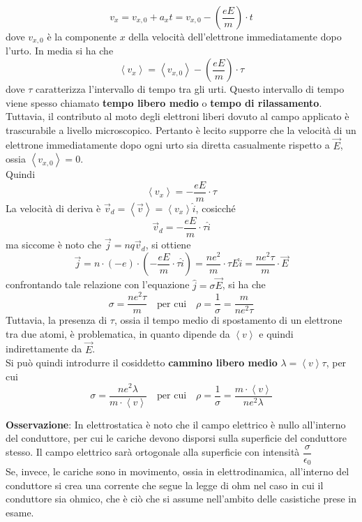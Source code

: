 \documentclass[a4paper]{extarticle}
\begin{document}
\[v_x = v_{x,0} + a_x t = v_{x,0} - \left(\dfrac{eE}{m}\right) \cdot t\]
dove $v_{x,0}$ è la componente $x$ della velocità dell'elettrone immediatamente dopo l'urto. In media si ha che
\[\left< v_x \right> = \left< v_{x,0} \right> - \left(\dfrac{eE}{m}\right) \cdot \tau\]
dove $\tau$ caratterizza l'intervallo di tempo tra gli urti. Questo intervallo di tempo viene spesso chiamato \textbf{tempo libero medio} o \textbf{tempo di rilassamento}.\\
Tuttavia, il contributo al moto degli elettroni liberi dovuto al campo applicato è trascurabile a livello microscopico. Pertanto è lecito supporre che la velocità di un elettrone immediatamente dopo ogni urto sia diretta casualmente rispetto a $\vec E$, ossia $\left<v_{x,0}\right> = 0$.\\
Quindi
\[\left<v_x\right> = - \dfrac{eE}{m} \cdot \tau\]
La velocità di deriva è $\vec{v}_d = \left<\vec v \right> = \left<v_x\right> \hat{i}$, cosicché
\[\vec{v}_d = - \dfrac{eE}{m} \cdot \tau \hat{i}\]
ma siccome è noto che $\vec j = n q \vec{v}_d$, si ottiene
\[\vec j = n \cdot (-e) \cdot \left(- \dfrac{eE}{m} \cdot \tau \hat{i}\right) = \dfrac{ne^2}{m} \cdot \tau E \hat{i} = \dfrac{ne^2 \tau}{m} \cdot \vec{E}\]
confrontando tale relazione con l'equazione $\hat{j} = \sigma \vec E$, si ha che
\[\sigma = \dfrac{n e^2 \tau}{m} \hspace{1em} \text{per cui} \hspace{1em} \rho=\dfrac{1}{\sigma} = \dfrac{m}{n e^2 \tau}\]
Tuttavia, la presenza di $\tau$, ossia il tempo medio di spostamento di un elettrone tra due atomi, è problematica, in quanto dipende da $\left<v\right>$ e quindi indirettamente da $\vec E$.\\
Si può quindi introdurre il cosiddetto \textbf{cammino libero medio} $\lambda = \left<v\right> \tau$, per cui
\[\sigma = \dfrac{n e^2 \lambda}{m \cdot \left<v\right>} \hspace{1em} \text{per cui} \hspace{1em} \rho=\dfrac{1}{\sigma} = \dfrac{m \cdot \left<v\right>}{n e^2 \lambda}\]

\vspace{1em}
\noindent
\textbf{Osservazione}: In elettrostatica è noto che il campo elettrico è nullo all'interno del conduttore, per cui le cariche devono disporsi sulla superficie del conduttore stesso. Il campo elettrico sarà ortogonale alla superficie con intensità $\dfrac{\sigma}{\epsilon_0}$\\
Se, invece, le cariche sono in movimento, ossia in elettrodinamica, all'interno del conduttore si crea una corrente che segue la legge di ohm nel caso in cui il conduttore sia ohmico, che è ciò che si assume nell'ambito delle casistiche prese in esame.
\end{document}
